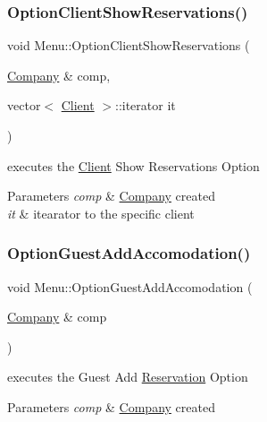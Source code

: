 \subsubsection{\texorpdfstring{Option\+Client\+Show\+Reservations()}{OptionClientShowReservations()}}
{\footnotesize\ttfamily void Menu\+::\+Option\+Client\+Show\+Reservations (\begin{DoxyParamCaption}\item[{\hyperlink{class_company}{Company} \&}]{comp,  }\item[{vector$<$ \hyperlink{class_client}{Client} $>$\+::iterator}]{it }\end{DoxyParamCaption})}



executes the \hyperlink{class_client}{Client} Show Reservations Option 


\begin{DoxyParams}{Parameters}
{\em comp} & \hyperlink{class_company}{Company} created\\
\hline
{\em it} & itearator to the specific client \\
\hline
\end{DoxyParams}
\hypertarget{class_menu_a1c7245c03f9932161ef7dc2361a9c55a}{}\label{class_menu_a1c7245c03f9932161ef7dc2361a9c55a} 
\subsubsection{\texorpdfstring{Option\+Guest\+Add\+Accomodation()}{OptionGuestAddAccomodation()}}
{\footnotesize\ttfamily void Menu\+::\+Option\+Guest\+Add\+Accomodation (\begin{DoxyParamCaption}\item[{\hyperlink{class_company}{Company} \&}]{comp }\end{DoxyParamCaption})}



executes the Guest Add \hyperlink{class_reservation}{Reservation} Option 


\begin{DoxyParams}{Parameters}
{\em comp} & \hyperlink{class_company}{Company} created \\
\hline
\end{DoxyParams}
\hypertarget{class_menu_ae3bbaa56e9712e3cf4e9616ee903ce87}{}\label{class_menu_ae3bbaa56e9712e3cf4e9616ee903ce87} 
